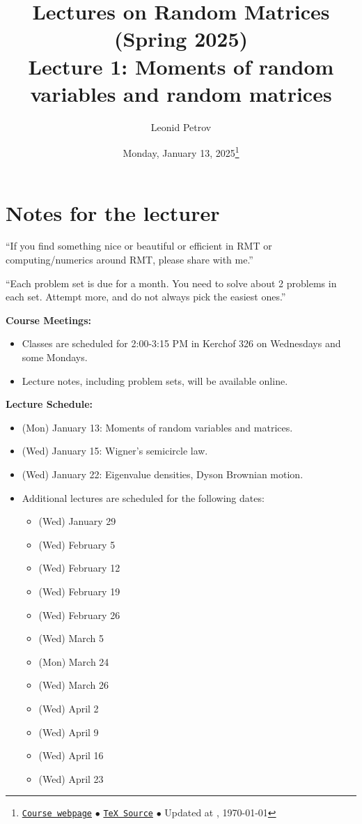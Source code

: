 \documentclass[letterpaper,11pt,oneside,reqno]{article}
\numberwithin{equation}{section}
\theoremstyle{definition}
\newenvironment{lnotes}{\section*{Notes for the lecturer}}{}
\begin{document}
\title{Lectures on Random Matrices
(Spring 2025)
\\Lecture 1: Moments of random variables and random
matrices}


\date{Monday, January 13, 2025\footnote{\href{https://lpetrov.cc/rmt25/}{\texttt{Course webpage}}
$\bullet$ \href{https://lpetrov.cc/rmt25/rmt25-notes/rmt2025-l01.tex}{\texttt{TeX Source}}
$\bullet$
Updated at \currenttime, \today}}



\author{Leonid Petrov}


\maketitle

\begin{lnotes}

``If you find something nice or beautiful or efficient in
RMT or computing/numerics around RMT, please share with me.''

\medskip

``Each problem set is due for a month.
You need to solve about 2 problems in each set. Attempt more,
and do not always pick the easiest ones.''

\medskip


\textbf{Course Meetings:}
\begin{itemize}
				\item Classes are scheduled for 2:00-3:15 PM in Kerchof 326 on Wednesdays and some Mondays.
				\item Lecture notes, including problem sets, will be available online.
\end{itemize}

\textbf{Lecture Schedule:}
\begin{itemize}
				\item (Mon) January 13: Moments of random variables and matrices.
				\item (Wed) January 15: Wigner's semicircle law.
				\item (Wed) January 22: Eigenvalue densities, Dyson Brownian motion.
				\item Additional lectures are scheduled for the following dates:
				\begin{itemize}
								\item (Wed) January 29
								\item (Wed) February 5
								\item (Wed) February 12
								\item (Wed) February 19
								\item (Wed) February 26
								\item (Wed) March 5
								\item (Mon) March 24
								\item (Wed) March 26
								\item (Wed) April 2
								\item (Wed) April 9
								\item (Wed) April 16
								\item (Wed) April 23
				\end{itemize}
\end{itemize}


\end{lnotes}
\end{document}
